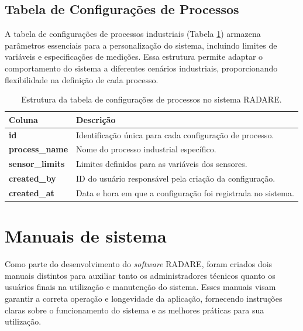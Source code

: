 \subsection{Tabela de Configurações de Processos}

A tabela de configurações de processos industriais (Tabela \ref{Tab:ProcessConfigurations}) armazena parâmetros essenciais para a personalização do sistema, incluindo limites de variáveis e especificações de medições. Essa estrutura permite adaptar o comportamento do sistema a diferentes cenários industriais, proporcionando flexibilidade na definição de cada processo.

\begin{table}[htbp]
    \centering
    \caption{Estrutura da tabela de configurações de processos no sistema RADARE.}
    \label{Tab:ProcessConfigurations}
    \begin{tabular}{|l|p{10cm}|}
        \hline
        \textbf{Coluna} & \textbf{Descrição} \\ \hline
        \textbf{id} & Identificação única para cada configuração de processo. \\ \hline
        \textbf{process\_name} & Nome do processo industrial específico. \\ \hline
        \textbf{sensor\_limits} & Limites definidos para as variáveis dos sensores. \\ \hline
        \textbf{created\_by} & ID do usuário responsável pela criação da configuração. \\ \hline
        \textbf{created\_at} & Data e hora em que a configuração foi registrada no sistema. \\ \hline
    \end{tabular}
\end{table}

\section{Manuais de sistema}

Como parte do desenvolvimento do \textit{software} RADARE, foram criados dois manuais distintos para auxiliar tanto os administradores técnicos quanto os usuários finais na utilização e manutenção do sistema. Esses manuais visam garantir a correta operação e longevidade da aplicação, fornecendo instruções claras sobre o funcionamento do sistema e as melhores práticas para sua utilização.

